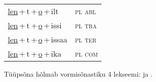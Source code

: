 \begin{minipage}{\textwidth}
\begin{sideways}
\begin{tabular}{l l}
\underline{len}\,+\,t\,+\,\underline{o}\,+\,ilt & \textsc{ pl abl } \\
\underline{len}\,+\,t\,+\,\underline{o}\,+\,issi & \textsc{ pl tra } \\
\underline{len}\,+\,t\,+\,\underline{o}\,+\,issaa & \textsc{ pl ter } \\
\underline{len}\,+\,t\,+\,\underline{o}\,+\,ika & \textsc{ pl com } \\
\end{tabular}
\end{sideways}
\label{tab:tüüpsõnamall-lento}

\end{minipage}

 
\vspace{1em}
\noindent Tüüpsõna hõlmab vormisõnastiku 4 lekseemi:  ja .

